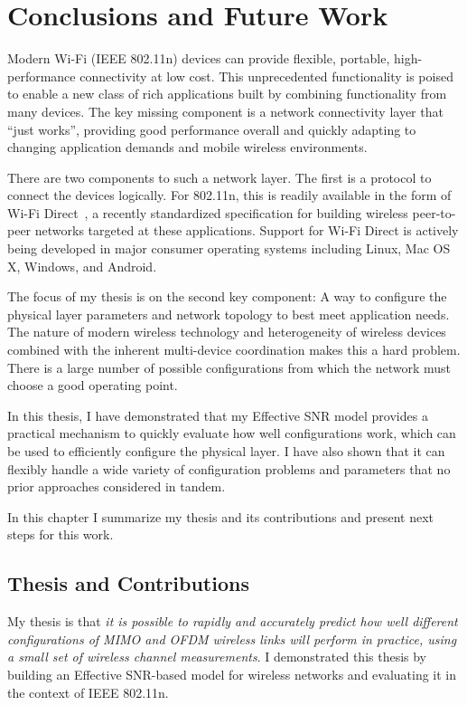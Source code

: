 \ifx\mainfile\undefined

\setcounter{chapter}{9} %
\fi

\cleardoublepage
\chapter{Conclusions and Future Work}
\label{chap:conclusion}

Modern Wi-Fi (IEEE 802.11n) devices can provide flexible, portable, high-performance connectivity at low cost. This unprecedented functionality is poised to enable a new class of rich applications built by combining functionality from many devices. The key missing component is a network connectivity layer that ``just works'', providing good performance overall and quickly adapting to changing application demands and mobile wireless environments.

There are two components to such a network layer. The first is a protocol to connect the devices logically. For 802.11n, this is readily available in the form of Wi-Fi Direct~\cite{wifi_direct}, a recently standardized specification for building wireless peer-to-peer networks targeted at these applications. Support for Wi-Fi Direct is actively being developed in major consumer operating systems including Linux, Mac OS X, Windows, and Android.

The focus of my thesis is on the second key component: A way to configure the physical layer parameters and network topology to best meet application needs. The nature of modern wireless technology and heterogeneity of wireless devices combined with the inherent multi-device coordination makes this a hard problem. There is a large number of possible configurations from which the network must choose a good operating point.

In this thesis, I have demonstrated that my Effective SNR model provides a practical mechanism to quickly evaluate how well configurations work, which can be used to efficiently configure the physical layer. I have also shown that it can flexibly handle a wide variety of configuration problems and parameters that no prior approaches considered in tandem.

In this chapter I summarize my thesis and its contributions and present next steps for this work.

\section{Thesis and Contributions}
My thesis is that \emph{it is possible to rapidly and accurately predict how well different configurations of MIMO and OFDM wireless links will perform in practice, using a small set of wireless channel measurements}. I demonstrated this thesis by building an Effective SNR-based model for wireless networks and evaluating it in the context of IEEE 802.11n.

